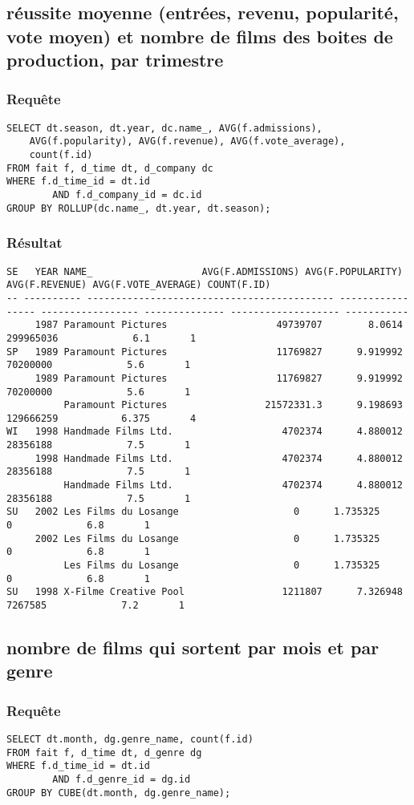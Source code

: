 \subsection{réussite moyenne (entrées, revenu, popularité, vote moyen) et nombre de films des boites de production, par trimestre}
\subsubsection{Requête}
\begin{lstlisting}
SELECT dt.season, dt.year, dc.name_, AVG(f.admissions),
	AVG(f.popularity), AVG(f.revenue), AVG(f.vote_average),
	count(f.id)
FROM fait f, d_time dt, d_company dc
WHERE f.d_time_id = dt.id
		AND f.d_company_id = dc.id
GROUP BY ROLLUP(dc.name_, dt.year, dt.season);
\end{lstlisting}
\subsubsection{Résultat}
\begin{lstlisting}
SE	 YEAR NAME_					  AVG(F.ADMISSIONS) AVG(F.POPULARITY) AVG(F.REVENUE) AVG(F.VOTE_AVERAGE) COUNT(F.ID)
-- ---------- ------------------------------------------- ----------------- ----------------- -------------- ------------------- -----------
	 1987 Paramount Pictures				   49739707	       8.0614	   299965036		     6.1	   1
SP	 1989 Paramount Pictures				   11769827	     9.919992	    70200000		     5.6	   1
	 1989 Paramount Pictures				   11769827	     9.919992	    70200000		     5.6	   1
	      Paramount Pictures				 21572331.3	     9.198693	   129666259		   6.375	   4
WI	 1998 Handmade Films Ltd.				    4702374	     4.880012	    28356188		     7.5	   1
	 1998 Handmade Films Ltd.				    4702374	     4.880012	    28356188		     7.5	   1
	      Handmade Films Ltd.				    4702374	     4.880012	    28356188		     7.5	   1
SU	 2002 Les Films du Losange					  0	     1.735325		   0		     6.8	   1
	 2002 Les Films du Losange					  0	     1.735325		   0		     6.8	   1
	      Les Films du Losange					  0	     1.735325		   0		     6.8	   1
SU	 1998 X-Filme Creative Pool				    1211807	     7.326948	     7267585		     7.2	   1

\end{lstlisting}

\subsection{nombre de films qui sortent par mois et par genre}
\subsubsection{Requête}
\begin{lstlisting}
SELECT dt.month, dg.genre_name, count(f.id)
FROM fait f, d_time dt, d_genre dg
WHERE f.d_time_id = dt.id
		AND f.d_genre_id = dg.id
GROUP BY CUBE(dt.month, dg.genre_name);
\end{lstlisting}
